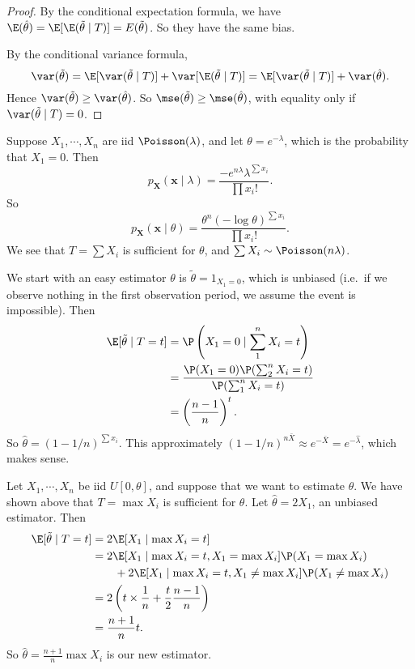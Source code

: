 \documentclass[a4paper]{article}
\begin{document}
\begin{proof}
  By the conditional expectation formula, we have $\E(\hat{\theta}) = \E[\E(\tilde{\theta}\mid T)] = E(\tilde{\theta})$. So they have the same bias.

  By the conditional variance formula,
  \[
    \var(\tilde{\theta}) = \E[\var (\tilde{\theta}\mid T)] + \var [\E(\tilde{\theta}\mid T)] = \E[\var(\tilde{\theta}\mid T)] + \var(\hat{\theta}).
  \]
  Hence $\var(\tilde{\theta}) \geq \var (\hat{\theta})$. So $\mse(\tilde{\theta}) \geq \mse(\hat{\theta})$, with equality only if $\var(\tilde{\theta}\mid T) = 0$.
\end{proof}

\begin{eg}
  Suppose $X_1, \cdots, X_n$ are iid $\Poisson(\lambda)$, and let $\theta = e^{-\lambda}$, which is the probability that $X_1 = 0$. Then
  \[
    p_\mathbf{X}(\mathbf{x}\mid \lambda) =\frac{-e^{n\lambda}\lambda^{\sum x_i}}{\prod x_i!}.
  \]
  So
  \[
    p_\mathbf{X}(\mathbf{x}\mid \theta) = \frac{\theta^n(-\log \theta)^{\sum x_i}}{\prod x_i!}.
  \]
  We see that $T = \sum X_i$ is sufficient for $\theta$, and $\sum X_i \sim \Poisson (n\lambda)$.

  We start with an easy estimator $\theta$ is $\tilde{\theta} = 1_{X_1 = 0}$, which is unbiased (i.e.\ if we observe nothing in the first observation period, we assume the event is impossible). Then
  \begin{align*}
    \E[\tilde{\theta}\mid T = t] &= \P\left(X_1 = 0 \mid \sum_1^n X_i = t\right)\\
    &= \frac{\P(X_1 = 0)\P(\sum_2^n X_i = t)}{\P(\sum_1^n X_i = t)}\\
    &= \left(\frac{n - 1}{n}\right)^t.
  \end{align*}
  So $\hat{\theta} = (1 - 1/n)^{\sum x_i}$. This approximately $(1 - 1/n)^{n\bar{X}} \approx e^{-\bar X} = e^{-\hat{\lambda}}$, which makes sense.
\end{eg}

\begin{eg}
  Let $X_1, \cdots, X_n$ be iid $U[0, \theta]$, and suppose that we want to estimate $\theta$. We have shown above that $T = \max X_i$ is sufficient for $\theta$. Let $\hat{\theta} = 2X_1$, an unbiased estimator. Then
  \begin{align*}
    \E[\tilde{\theta}\mid T = t] &= 2\E[X_1\mid \max X_i = t]\\
    &= 2\E[X_1\mid \max X_i = t, X_1 = \max X_i]\P(X_1 = \max X_i)\\
    &\quad\quad+ 2\E[X_1\mid \max X_i = t, X_1 \not= \max X_i] \P(X_1 \not= \max X_i)\\
    &= 2\left(t\times \frac{1}{n} + \frac{t}{2}\frac{n - 1}{n}\right)\\
    &= \frac{n + 1}{n}t.
  \end{align*}
  So $\hat{\theta} = \frac{n + 1}{n}\max X_i$ is our new estimator.
\end{eg}
\end{document}

